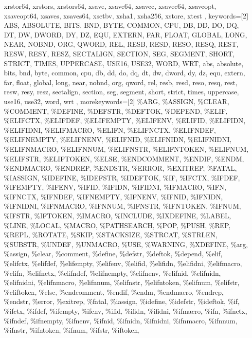 {{xrstor64, xrstors, xrstors64, xsave, xsave64, xsavec, xsavec64, xsaveopt,
xsaveopt64, xsaves, xsaves64, xsetbv, xsha1, xsha256, xstore, xtest
	},
	keywords=[2]{
ABS, ABSOLUTE, BITS, BND, BYTE, COMMON, CPU, DB, DD, DO, DQ, DT, DW, DWORD, DY,
DZ, EQU, EXTERN, FAR, FLOAT, GLOBAL, LONG, NEAR, NOBND, ORG, QWORD, REL, RESB,
RESD, RESO, RESQ, REST, RESW, RESY, RESZ, SECTALIGN, SECTION, SEG, SEGMENT,
SHORT, STRICT, TIMES, UPPERCASE, USE16, USE32, WORD, WRT,
abs, absolute, bits, bnd, byte, common, cpu, db, dd, do, dq, dt, dw, dword, dy,
dz, equ, extern, far, float, global, long, near, nobnd, org, qword, rel, resb,
resd, reso, resq, rest, resw, resy, resz, sectalign, section, seg, segment,
short, strict, times, uppercase, use16, use32, word, wrt
	},
	morekeywords=[2]{
\%ARG, \%ASSIGN, \%CLEAR, \%COMMENT, \%DEFINE, \%DEFSTR, \%DEFTOK, \%DEPEND,
\%ELIF, \%ELIFCTX, \%ELIFDEF, \%ELIFEMPTY, \%ELIFENV, \%ELIFID, \%ELIFIDN,
\%ELIFIDNI, \%ELIFMACRO, \%ELIFN, \%ELIFNCTX, \%ELIFNDEF, \%ELIFNEMPTY,
\%ELIFNENV, \%ELIFNID, \%ELIFNIDN, \%ELIFNIDNI, \%ELIFNMACRO, \%ELIFNNUM,
\%ELIFNSTR, \%ELIFNTOKEN, \%ELIFNUM, \%ELIFSTR, \%ELIFTOKEN, \%ELSE,
\%ENDCOMMENT, \%ENDIF, \%ENDM, \%ENDMACRO, \%ENDREP, \%ENDSTR, \%ERROR,
\%EXITREP, \%FATAL, \%IASSIGN, \%IDEFINE, \%IDEFSTR, \%IDEFTOK, \%IF, \%IFCTX,
\%IFDEF, \%IFEMPTY, \%IFENV, \%IFID, \%IFIDN, \%IFIDNI, \%IFMACRO, \%IFN,
\%IFNCTX, \%IFNDEF, \%IFNEMPTY, \%IFNENV, \%IFNID, \%IFNIDN, \%IFNIDNI,
\%IFNMACRO, \%IFNNUM, \%IFNSTR, \%IFNTOKEN, \%IFNUM, \%IFSTR, \%IFTOKEN,
\%IMACRO, \%INCLUDE, \%IXDEFINE, \%LABEL, \%LINE, \%LOCAL, \%MACRO,
\%PATHSEARCH, \%POP, \%PUSH, \%REP, \%REPL, \%ROTATE, \%SKIP, \%STACKSIZE,
\%STRCAT, \%STRLEN, \%SUBSTR, \%UNDEF, \%UNMACRO, \%USE, \%WARNING, \%XDEFINE,
\%arg, \%assign, \%clear, \%comment, \%define, \%defstr, \%deftok, \%depend,
\%elif, \%elifctx, \%elifdef, \%elifempty, \%elifenv, \%elifid, \%elifidn,
\%elifidni, \%elifmacro, \%elifn, \%elifnctx, \%elifndef, \%elifnempty,
\%elifnenv, \%elifnid, \%elifnidn, \%elifnidni, \%elifnmacro, \%elifnnum,
\%elifnstr, \%elifntoken, \%elifnum, \%elifstr, \%eliftoken, \%else,
\%endcomment, \%endif, \%endm, \%endmacro, \%endrep, \%endstr, \%error,
\%exitrep, \%fatal, \%iassign, \%idefine, \%idefstr, \%ideftok, \%if, \%ifctx,
\%ifdef, \%ifempty, \%ifenv, \%ifid, \%ifidn, \%ifidni, \%ifmacro, \%ifn,
\%ifnctx, \%ifndef, \%ifnempty, \%ifnenv, \%ifnid, \%ifnidn, \%ifnidni,
\%ifnmacro, \%ifnnum, \%ifnstr, \%ifntoken, \%ifnum, \%ifstr, \%iftoken,
}}
